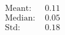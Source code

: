 \documentclass[preview]{standalone}
\begin{document}
\begin{align*}
\text{Meant: } &0.11\\\text{Median: } &0.05\\\text{Std: } &0.18
\end{align*}
\end{document}

